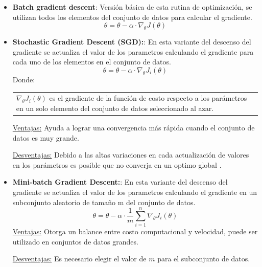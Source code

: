 \documentclass[11pt,fleqn]{book} %
\begin{document}
\begin{itemize}

\item \textbf{Batch gradient descent}: Versión básica de esta rutina de optimización, se utilizan todos los elementos del conjunto de datos para calcular el gradiente.
\begin{equation}
\label{eqn:batch_gradient_descent}
\theta = \theta - \alpha \cdot  \nabla _{\theta} J(\theta)
\end{equation}

\item \textbf{Stochastic Gradient Descent (SGD):}: En esta variante del descenso del gradiente se actualiza el valor de los parametros calculando el gradiente para cada uno de los elementos en el conjunto de datos.
\begin{equation}
\label{eqn:stochastic_gradient_descent}
\theta = \theta - \alpha \cdot  \nabla _{\theta} J_{i}(\theta)
\end{equation}
Donde:

\begin{tabular}{l}
\makecell[l]{$\nabla _{\theta} J_{i}(\theta)$ es el gradiente de la función de costo respecto a los parámetros en un solo \\elemento del conjunto de datos seleccionado al azar.} \\
\end{tabular}

\underline{Ventajas:}
Ayuda a lograr una convergencia más rápida cuando el conjunto de datos es muy grande.

\underline{Desventajas:}
Debido a las altas variaciones en cada actualización de valores en los parámetros es posible que no converja en un optimo global .
\\

\item \textbf{Mini-batch Gradient Descent:}: En esta variante del descenso del gradiente se actualiza el valor de los parametros calculando el gradiente en un subconjunto aleatorio de tamaño m del conjunto de datos.
\begin{equation}
\label{eqn:mini_batch_gradient_descent}
\theta = \theta - \alpha \cdot   \frac{1}{m} \sum_{i=1}^{n}  \nabla _{\theta} J_{i}(\theta)
\end{equation}
\underline{Ventajas:}
Otorga un balance entre costo computacional y velocidad, puede ser utilizado en conjuntos de datos grandes.

\underline{Desventajas:}
Es necesario elegir el valor de $m$ para el subconjunto de datos.
\\


\end{itemize}
\end{document}
